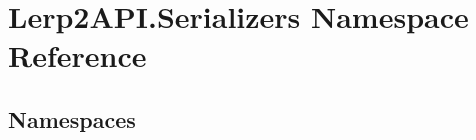\hypertarget{namespace_lerp2_a_p_i_1_1_serializers}{}\section{Lerp2\+A\+P\+I.\+Serializers Namespace Reference}
\label{namespace_lerp2_a_p_i_1_1_serializers}
\subsection*{Namespaces}
\begin{DoxyCompactItemize}
\end{DoxyCompactItemize}
